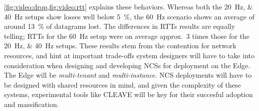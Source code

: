 \cref{fig:video:drop,fig:video:rtt} explains these behaviors.
Whereas both the \SIlist{20;40}{\hertz} setups show losses well below \SI{5}{\percent}, the \SI{60}{\hertz} scenario shows an average of around \SI{13}{\percent} of datagrams lost.
The differences in \acp{RTT} results are equally telling; \acp{RTT} for the \SI{60}{\hertz} setup were on average approx.\ \num{3} times those for the \SIlist{20;40}{\hertz} setups.
These results stem from the contention for network resources, and hint at important trade-offs system designers will have to take into consideration when designing and developing \acp{NCS} for deployment on the Edge.
The Edge will be \emph{multi-tenant} and \emph{multi-instance}. 
\ac{NCS} deployments will have to be designed with shared resources in mind, and given the complexity of these systems, experimental tools like \ac{CLEAVE} will be key for their succesful adoption and massification.
